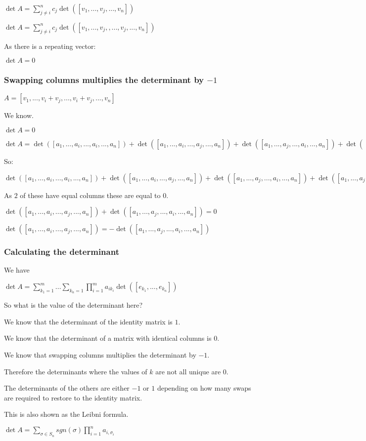 \(\det A=\sum_{j\ne i}^{n}c_j\det ([v_1,...,v_j,...,v_n])\)

\(\det A=\sum_{j\ne i}^{n}c_j\det ([v_1,...,v_j,,...,v_j,...,v_n])\)

As there is a repeating vector:

\(\det A=0\)

\subsubsection{Swapping columns multiplies the determinant by \(-1\)}

\(A=[v_1,...,v_i+v_j,...,v_i+v_j,...,v_n]\)

We know.

\(\det A=0\)

\(\det A=\det ([a_1,...,a_i,...,a_i,...,a_n])+\det([a_1,...,a_i,...,a_j,...,a_n])+\det([a_1,...,a_j,...,a_i,...,a_n])+\det([a_1,...,a_j,...,a_j,...,a_n])\)

So:

\(\det ([a_1,...,a_i,...,a_i,...,a_n])+\det ([a_1,...,a_i,...,a_j,...,a_n])+\det([a_1,...,a_j,...,a_i,...,a_n])+\det([a_1,...,a_j,...,a_j,...,a_n])=0\)

As \(2\) of these have equal columns these are equal to \(0\).

\(\det ([a_1,...,a_i,...,a_j,...,a_n])+\det ([a_1,...,a_j,...,a_i,...,a_n])=0\)

\(\det ([a_1,...,a_i,...,a_j,...,a_n])=-\det ([a_1,...,a_j,...,a_i,...,a_n])\)

\subsubsection{Calculating the determinant}

We have

\(\det A=\sum_{k_1=1}^m...\sum_{k_n=1}\prod_{i=1}^ma_{ik_i}\det ([e_{k_1},...,e_{k_n}])\)

So what is the value of the determinant here?

We know that the determinant of the identity matrix is \(1\).

We know that the determinant of a matrix with identical columns is \(0\).

We know that swapping columns multiplies the determinant by \(-1\).

Therefore the determinants where the values of \(k\) are not all unique are \(0\).

The determinants of the others are either \(-1\) or \(1\) depending on how many swaps are required to restore to the identity matrix.

This is also shown as the Leibni formula.

\(\det A = \sum_{\sigma \in S_n}sgn (\sigma )\prod_{i=1}^na_{i,\sigma_i}\)

